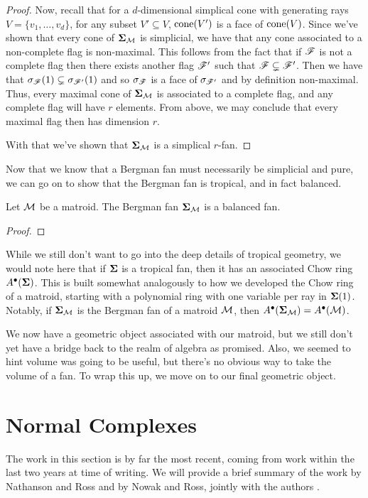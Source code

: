 \documentclass[12pt,oneside]{../../sfsuthesis}
\begin{document}
\begin{proof}
    Now, recall that for a \( d \)-dimensional simplical cone with generating rays \(  V = \{ v_1, \dots, v_d \} \), for any subset \( V' \subseteq V \),
    \( \mathrm{cone}(V') \) is a face of \( \mathrm{cone}(V) \).
    Since we've  shown that every cone of \( \bm{\Sigma}_{\mathcal{M}} \) is simplicial, we have that any cone associated to a non-complete flag is non-maximal.
    This follows from the fact that if \( \mathscr{F} \) is not a complete flag then there exists another flag \( \mathscr{F}' \) such that \( \mathscr{F} \subsetneq \mathscr{F}' \).
    Then we have that \( \sigma_{\mathscr{F}}(1) \subsetneq \sigma_{\mathscr{F}'}(1) \) and so \( \sigma_{\mathscr{F}} \) is a face of \( \sigma_{\mathscr{F}'} \) and by definition non-maximal.
    Thus, every maximal cone of \( \bm{\Sigma}_{\mathcal{M}} \) is associated to a complete flag, and any complete flag will have \( r \) elements.
    From above, we may conclude that every maximal flag then has dimension \( r \).

    With that we've shown that \( \bm{\Sigma}_{\mathcal{M}} \) is a simplical \( r \)-fan.

\end{proof}
Now that we know that a Bergman fan must necessarily be simplicial and pure, we can go on to show that the Bergman fan is tropical, and in fact balanced.
\begin{proposition}
    Let \( \mathcal{M} \) be a matroid.
    The Bergman fan \( \bm{\Sigma}_{\mathcal{M}} \) is a balanced fan.
\end{proposition}
\begin{proof}
\end{proof}
While we still don't want to go into the deep details of tropical geometry, we would note here that if \( \bm{\Sigma} \) is a tropical fan, then it has an associated Chow ring \( A^\bullet(\bm{\Sigma}) \).
This is built somewhat analogously to how we developed the Chow ring of a matroid,  starting with a polynomial ring with one variable per ray in \( \bm{\Sigma}(1) \).
Notably, if \( \bm{\Sigma}_{\mathcal{M}} \) is the Bergman fan of a matroid \( \mathcal{M} \), then \( A^\bullet(\bm{\Sigma}_{\mathcal{M}}) = A^\bullet(\mathcal{M}) \).

We now have a geometric object associated with our matroid, but we still don't yet have a bridge back to the realm of algebra as promised.
Also, we seemed to hint volume was going to be useful, but there's no obvious way to take the volume of a fan.
To wrap this up, we move on to our final geometric object.

\section{Normal Complexes}
The work in this section is by far the most recent, coming from work within the last two years at time of writing.
We will provide a brief summary of the work by Nathanson and Ross \cite{nathansonTropicalFansNormal2023} and by Nowak and Ross, jointly with the authors \cite{nowakMixedVolumesNormal2023}.
\end{document}
